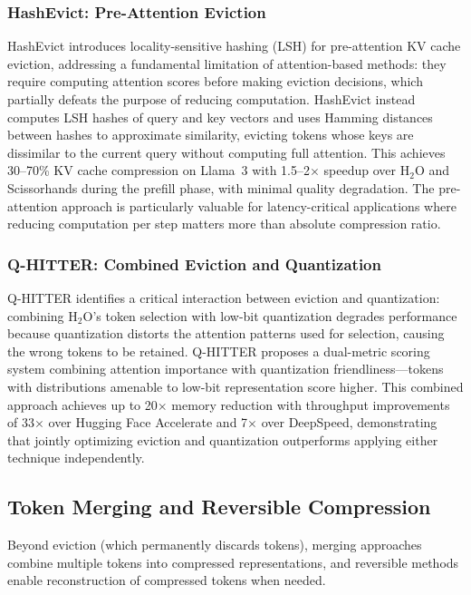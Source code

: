 \documentclass[11pt,letterpaper]{article}
\begin{document}
\subsubsection{HashEvict: Pre-Attention Eviction}

HashEvict introduces locality-sensitive hashing (LSH) for pre-attention KV cache eviction, addressing a fundamental limitation of attention-based methods: they require computing attention scores before making eviction decisions, which partially defeats the purpose of reducing computation. HashEvict instead computes LSH hashes of query and key vectors and uses Hamming distances between hashes to approximate similarity, evicting tokens whose keys are dissimilar to the current query without computing full attention. This achieves 30--70\% KV cache compression on Llama~3 with 1.5--2$\times$ speedup over H$_2$O and Scissorhands during the prefill phase, with minimal quality degradation. The pre-attention approach is particularly valuable for latency-critical applications where reducing computation per step matters more than absolute compression ratio.

\subsubsection{Q-HITTER: Combined Eviction and Quantization}

Q-HITTER identifies a critical interaction between eviction and quantization: combining H$_2$O's token selection with low-bit quantization degrades performance because quantization distorts the attention patterns used for selection, causing the wrong tokens to be retained. Q-HITTER proposes a dual-metric scoring system combining attention importance with quantization friendliness---tokens with distributions amenable to low-bit representation score higher. This combined approach achieves up to 20$\times$ memory reduction with throughput improvements of 33$\times$ over Hugging Face Accelerate and 7$\times$ over DeepSpeed, demonstrating that jointly optimizing eviction and quantization outperforms applying either technique independently.

\subsection{Token Merging and Reversible Compression}

Beyond eviction (which permanently discards tokens), merging approaches combine multiple tokens into compressed representations, and reversible methods enable reconstruction of compressed tokens when needed.
\end{document}
